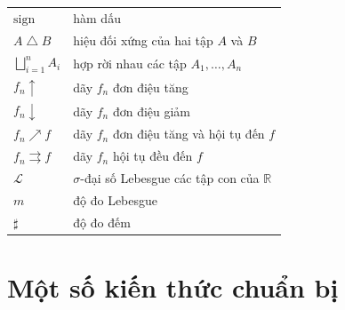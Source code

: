 \documentclass[12pt,a4paper,oneside]{report}
\numberwithin{equation}{section}
\def\R{\mathbb{R}}
\def\L{\mathcal{L}}
\def\sgn{\text{sign}}
\begin{document}
\begin{tabular}{l l}
$ \sgn $&hàm dấu\\
$A\bigtriangleup B$&hiệu đối xứng của hai tập $A$ và $B$\\
$\bigsqcup_{i=1}^n A_i$&hợp rời nhau các tập $A_1,\ldots,A_n$\\
$f_n\uparrow$&dãy $f_n$ đơn điệu tăng\\
$f_n\downarrow$&dãy $f_n$ đơn điệu giảm\\
$f_n\nearrow f$&dãy $f_n$ đơn điệu tăng và hội tụ đến $f$\\
$f_n\rightrightarrows f$&dãy $f_n$ hội tụ đều đến $f$\\	
$\L$&$\sigma$-đại số Lebesgue các tập con của $\R$\\
$m$&độ đo Lebesgue\\
$\sharp$&độ đo đếm
	
\end{tabular}
\chapter{Một số kiến thức chuẩn bị}
\end{document}
